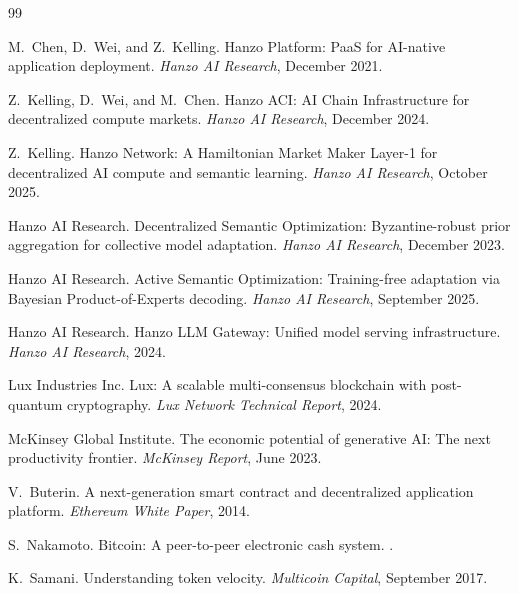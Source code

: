 \begin{thebibliography}{99}

M.~Chen, D.~Wei, and Z.~Kelling.
\newblock Hanzo Platform: {PaaS} for {AI}-native application deployment.
\newblock \emph{Hanzo AI Research}, December 2021.

Z.~Kelling, D.~Wei, and M.~Chen.
\newblock Hanzo {ACI}: {AI} Chain Infrastructure for decentralized compute markets.
\newblock \emph{Hanzo AI Research}, December 2024.

Z.~Kelling.
\newblock Hanzo Network: A {Hamiltonian} Market Maker {Layer-1} for decentralized {AI} compute and semantic learning.
\newblock \emph{Hanzo AI Research}, October 2025.

{Hanzo AI Research}.
\newblock Decentralized Semantic Optimization: {Byzantine}-robust prior aggregation for collective model adaptation.
\newblock \emph{Hanzo AI Research}, December 2023.

{Hanzo AI Research}.
\newblock Active Semantic Optimization: Training-free adaptation via {Bayesian} Product-of-Experts decoding.
\newblock \emph{Hanzo AI Research}, September 2025.

{Hanzo AI Research}.
\newblock Hanzo {LLM} Gateway: Unified model serving infrastructure.
\newblock \emph{Hanzo AI Research}, 2024.

{Lux Industries Inc}.
\newblock Lux: A scalable multi-consensus blockchain with post-quantum cryptography.
\newblock \emph{Lux Network Technical Report}, 2024.

{McKinsey Global Institute}.
\newblock The economic potential of generative {AI}: The next productivity frontier.
\newblock \emph{McKinsey Report}, June 2023.

V.~Buterin.
\newblock A next-generation smart contract and decentralized application platform.
\newblock \emph{Ethereum White Paper}, 2014.

S.~Nakamoto.
\newblock Bitcoin: A peer-to-peer electronic cash system.
.

K.~Samani.
\newblock Understanding token velocity.
\newblock \emph{Multicoin Capital}, September 2017.


\end{thebibliography}

